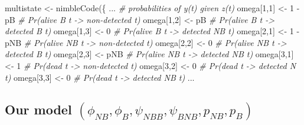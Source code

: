 \documentclass[
  12pt,
]{krantz}
\newenvironment{Shaded}{\begin{snugshade}}{\end{snugshade}}
\newcommand{\CommentTok}[1]{\textcolor[rgb]{0.56,0.35,0.01}{\textit{#1}}}
\newcommand{\DecValTok}[1]{\textcolor[rgb]{0.00,0.00,0.81}{#1}}
\newcommand{\FunctionTok}[1]{\textcolor[rgb]{0.00,0.00,0.00}{#1}}
\newcommand{\NormalTok}[1]{#1}
\newcommand{\OtherTok}[1]{\textcolor[rgb]{0.56,0.35,0.01}{#1}}
\newcommand{\SpecialCharTok}[1]{\textcolor[rgb]{0.00,0.00,0.00}{#1}}
\begin{document}
\begin{Shaded}
\begin{Highlighting}[]
\NormalTok{multistate }\OtherTok{\textless{}{-}} \FunctionTok{nimbleCode}\NormalTok{(\{}
\NormalTok{...}
  \CommentTok{\# probabilities of y(t) given z(t)}
\NormalTok{  omega[}\DecValTok{1}\NormalTok{,}\DecValTok{1}\NormalTok{] }\OtherTok{\textless{}{-}} \DecValTok{1} \SpecialCharTok{{-}}\NormalTok{ pB    }\CommentTok{\# Pr(alive B t {-}\textgreater{} non{-}detected t)}
\NormalTok{  omega[}\DecValTok{1}\NormalTok{,}\DecValTok{2}\NormalTok{] }\OtherTok{\textless{}{-}}\NormalTok{ pB        }\CommentTok{\# Pr(alive B t {-}\textgreater{} detected B t)}
\NormalTok{  omega[}\DecValTok{1}\NormalTok{,}\DecValTok{3}\NormalTok{] }\OtherTok{\textless{}{-}} \DecValTok{0}         \CommentTok{\# Pr(alive B t {-}\textgreater{} detected NB t)}
\NormalTok{  omega[}\DecValTok{2}\NormalTok{,}\DecValTok{1}\NormalTok{] }\OtherTok{\textless{}{-}} \DecValTok{1} \SpecialCharTok{{-}}\NormalTok{ pNB   }\CommentTok{\# Pr(alive NB t {-}\textgreater{} non{-}detected t)}
\NormalTok{  omega[}\DecValTok{2}\NormalTok{,}\DecValTok{2}\NormalTok{] }\OtherTok{\textless{}{-}} \DecValTok{0}         \CommentTok{\# Pr(alive NB t {-}\textgreater{} detected B t)}
\NormalTok{  omega[}\DecValTok{2}\NormalTok{,}\DecValTok{3}\NormalTok{] }\OtherTok{\textless{}{-}}\NormalTok{ pNB       }\CommentTok{\# Pr(alive NB t {-}\textgreater{} detected NB t)}
\NormalTok{  omega[}\DecValTok{3}\NormalTok{,}\DecValTok{1}\NormalTok{] }\OtherTok{\textless{}{-}} \DecValTok{1}         \CommentTok{\# Pr(dead t {-}\textgreater{} non{-}detected t)}
\NormalTok{  omega[}\DecValTok{3}\NormalTok{,}\DecValTok{2}\NormalTok{] }\OtherTok{\textless{}{-}} \DecValTok{0}         \CommentTok{\# Pr(dead t {-}\textgreater{} detected N t)}
\NormalTok{  omega[}\DecValTok{3}\NormalTok{,}\DecValTok{3}\NormalTok{] }\OtherTok{\textless{}{-}} \DecValTok{0}         \CommentTok{\# Pr(dead t {-}\textgreater{} detected NB t)}
\NormalTok{...}
\end{Highlighting}
\end{Shaded}

\hypertarget{our-model-phi_nb-phi_b-psi_nbb-psi_bnb-p_nb-p_b-4}{%
\subsection{\texorpdfstring{Our model \((\phi_{NB}, \phi_B, \psi_{NBB}, \psi_{BNB}, p_{NB}, p_B)\)}{Our model (\textbackslash phi\_\{NB\}, \textbackslash phi\_B, \textbackslash psi\_\{NBB\}, \textbackslash psi\_\{BNB\}, p\_\{NB\}, p\_B)}}\label{our-model-phi_nb-phi_b-psi_nbb-psi_bnb-p_nb-p_b-4}}
\end{document}
